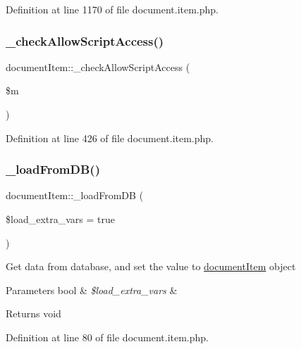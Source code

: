 Definition at line 1170 of file document.\+item.\+php.

\mbox{\label{classdocumentItem_a0d88d945333c887802ad1f8442f5d5c7}} 
\subsubsection{\texorpdfstring{\+\_\+check\+Allow\+Script\+Access()}{\_checkAllowScriptAccess()}}
{\footnotesize\ttfamily document\+Item\+::\+\_\+check\+Allow\+Script\+Access (\begin{DoxyParamCaption}\item[{}]{\$m }\end{DoxyParamCaption})}



Definition at line 426 of file document.\+item.\+php.

\mbox{\label{classdocumentItem_a277e26ba6e0abb42dab5cccbdf48e450}} 
\subsubsection{\texorpdfstring{\+\_\+load\+From\+D\+B()}{\_loadFromDB()}}
{\footnotesize\ttfamily document\+Item\+::\+\_\+load\+From\+DB (\begin{DoxyParamCaption}\item[{}]{\$load\+\_\+extra\+\_\+vars = {\ttfamily true} }\end{DoxyParamCaption})}

Get data from database, and set the value to \hyperlink{classdocumentItem}{document\+Item} object 
\begin{DoxyParams}[1]{Parameters}
bool & {\em \$load\+\_\+extra\+\_\+vars} & \\
\hline
\end{DoxyParams}
\begin{DoxyReturn}{Returns}
void 
\end{DoxyReturn}


Definition at line 80 of file document.\+item.\+php.

